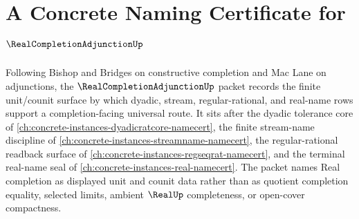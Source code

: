 \chapter{A Concrete Naming Certificate for $\RealCompletionAdjunctionUp$}
\label{ch:concrete-instances-real-completion-adjunction-namecert}

Following Bishop and Bridges on constructive completion and Mac Lane on adjunctions, the $\RealCompletionAdjunctionUp$ packet records the finite unit/counit surface by which dyadic, stream, regular-rational, and real-name rows support a completion-facing universal route. It sits after the dyadic tolerance core of \autoref{ch:concrete-instances-dyadicratcore-namecert}, the finite stream-name discipline of \autoref{ch:concrete-instances-streamname-namecert}, the regular-rational readback surface of \autoref{ch:concrete-instances-regseqrat-namecert}, and the terminal real-name seal of \autoref{ch:concrete-instances-real-namecert}. The packet names Real completion as displayed unit and counit data rather than as quotient completion equality, selected limits, ambient $\RealUp$ completeness, or open-cover compactness.

